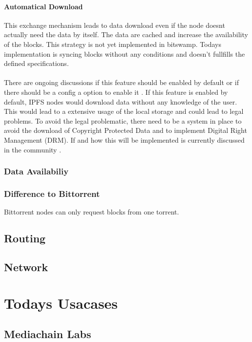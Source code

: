 \documentclass[a4paper,11pt, oneside]{report}
\theoremstyle{definition}
\begin{document}
\subsubsection{Automatical Download}
This exchange mechanism leads to data download even if the node doesnt actually need the data by itself. The data are cached and increase the availability of the blocks. This strategy is not yet implemented in bitswamp. Todays implementation is syncing blocks without any conditions and doesn't fullfills the defined specifications.\\ \\ 
There are ongoing discussions if this feature should be enabled by default or if there should be a config a option to enable it \cite{bitswapstrategy}. If this feature is enabled by default, IPFS nodes would download data without any knowledge of the user. This would lead to a extensive usage of the local storage and could lead to legal problems. To avoid the legal problematic, there need to be a system in place to avoid the download of Copyright Protected Data and to implement Digital Right Management (DRM). If and how this will be implemented is currently discussed in the community \cite{copyright}.


\newpage
\subsection{Data Availabiliy}


\subsection{Difference to Bittorrent}

Bittorrent nodes can only request blocks from one torrent.


\section{Routing}

\section{Network}

\chapter{Todays Usacases}
\section{Mediachain Labs}
\end{document}
